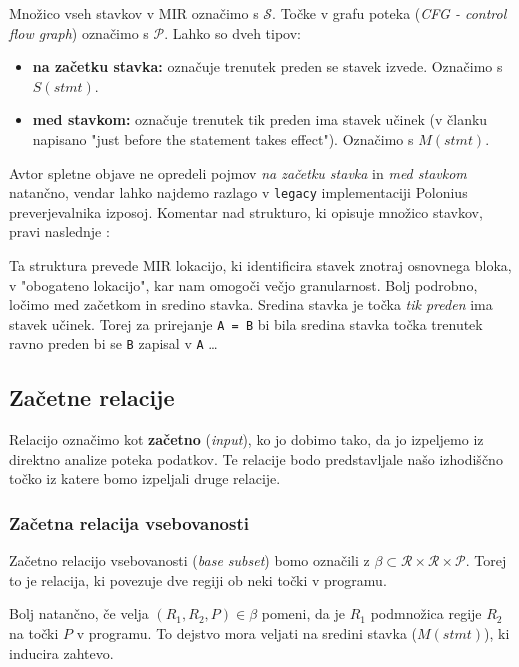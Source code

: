 \documentclass[a4paper,12pt,openright]{book}
\begin{document}
Množico vseh stavkov v MIR označimo s $\mathcal{S}$. Točke v grafu poteka (\textit{CFG - control flow graph})
označimo s $\mathcal{P}$. Lahko so dveh tipov:
\begin{itemize}
	\item \textbf{na začetku stavka:} označuje trenutek preden se stavek izvede. Označimo s $S(stmt)$.
	\item \textbf{med stavkom:} označuje trenutek tik preden ima stavek učinek (v članku napisano "just before the statement takes effect").
	      Označimo s $M(stmt)$.
\end{itemize}

Avtor spletne objave ne opredeli pojmov \textit{na začetku stavka} in \textit{med stavkom} natančno,
vendar lahko najdemo razlago v \verb|legacy| implementaciji Polonius preverjevalnika izposoj.
Komentar nad strukturo, ki opisuje množico stavkov, pravi naslednje \cite{RustCompilerRustc_borrowcka}:

\begin{displayquote}
	Ta struktura prevede MIR lokacijo, ki identificira stavek znotraj osnovnega bloka, v "obogateno lokacijo",
	kar nam omogoči večjo granularnost. Bolj podrobno, ločimo med začetkom in sredino stavka. Sredina stavka
	je točka \textit{tik preden} ima stavek učinek. Torej za prirejanje \verb|A = B| bi bila sredina stavka
	točka trenutek ravno preden bi se \verb|B| zapisal v \verb|A| \dots
\end{displayquote}

\subsection{Začetne relacije}

Relacijo označimo kot \textbf{začetno} (\textit{input}), ko jo dobimo tako, da jo izpeljemo
iz direktno analize poteka podatkov. Te relacije bodo predstavljale našo izhodiščno točko iz katere bomo izpeljali druge relacije.


\subsubsection{Začetna relacija vsebovanosti}

Začetno relacijo vsebovanosti (\textit{base subset}) bomo označili z
$\beta \subset \mathcal{R} \times \mathcal{R} \times \mathcal{P}$. Torej to je relacija, ki povezuje dve regiji
ob neki točki v programu.

Bolj natančno, če velja $(R_{1}, R_{2}, P) \in \beta$ pomeni, da je $R_{1}$ podmnožica regije $R_{2}$ na točki $P$ v programu.
To dejstvo mora veljati na sredini stavka ($M(stmt)$), ki inducira zahtevo.
\end{document}
